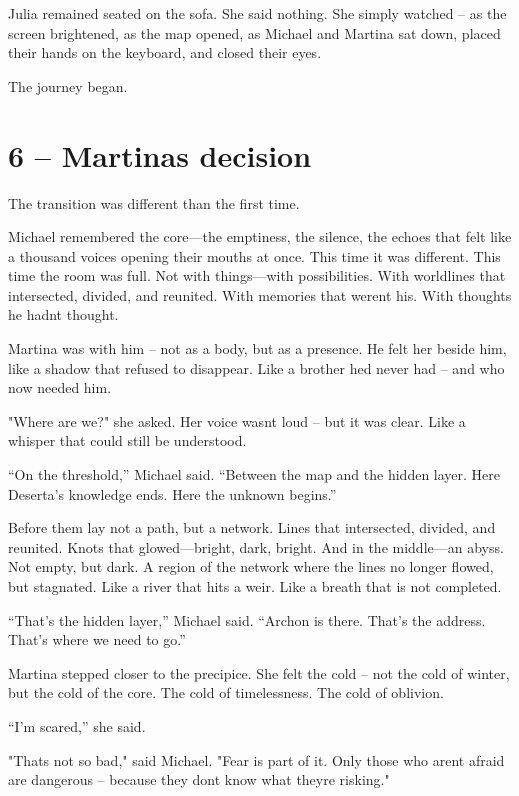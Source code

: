 \documentclass[
]{article}
\begin{document}
Julia remained seated on the sofa. She said nothing. She simply watched -- as the screen brightened, as the map opened, as Michael and Martina sat down, placed their hands on the keyboard, and closed their eyes.

The journey began.

\section{6 -- Martina\textquotesingle s decision}\label{martinas-decision}

The transition was different than the first time.

Michael remembered the core---the emptiness, the silence, the echoes that felt like a thousand voices opening their mouths at once. This time it was different. This time the room was full. Not with things---with possibilities. With worldlines that intersected, divided, and reunited. With memories that weren\textquotesingle t his. With thoughts he hadn\textquotesingle t thought.

Martina was with him -- not as a body, but as a presence. He felt her beside him, like a shadow that refused to disappear. Like a brother he\textquotesingle d never had -- and who now needed him.

"Where are we?" she asked. Her voice wasn\textquotesingle t loud -- but it was clear. Like a whisper that could still be understood.

``On the threshold,'' Michael said. ``Between the map and the hidden layer. Here Deserta's knowledge ends. Here the unknown begins.''

Before them lay not a path, but a network. Lines that intersected, divided, and reunited. Knots that glowed---bright, dark, bright. And in the middle---an abyss. Not empty, but dark. A region of the network where the lines no longer flowed, but stagnated. Like a river that hits a weir. Like a breath that is not completed.

``That's the hidden layer,'' Michael said. ``Archon is there. That's the address. That's where we need to go.''

Martina stepped closer to the precipice. She felt the cold -- not the cold of winter, but the cold of the core. The cold of timelessness. The cold of oblivion.

``I'm scared,'' she said.

"That\textquotesingle s not so bad," said Michael. "Fear is part of it. Only those who aren\textquotesingle t afraid are dangerous -- because they don\textquotesingle t know what they\textquotesingle re risking."
\end{document}
